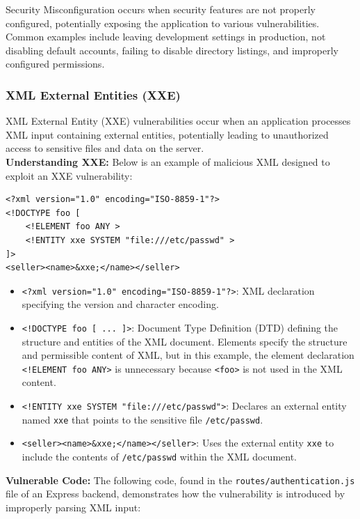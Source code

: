 \documentclass[]{article}
\begin{document}
Security Misconfiguration occurs when security features are not properly configured, potentially exposing the application to various vulnerabilities. Common examples include leaving development settings in production, not disabling default accounts, failing to disable directory listings, and improperly configured permissions.

\subsubsection{XML External Entities (XXE)}

XML External Entity (XXE) vulnerabilities occur when an application processes XML input containing external entities, potentially leading to unauthorized access to sensitive files and data on the server. \\ 
\textbf{Understanding XXE:}
Below is an example of malicious XML designed to exploit an XXE vulnerability:

\begin{lstlisting}
<?xml version="1.0" encoding="ISO-8859-1"?>
<!DOCTYPE foo [
    <!ELEMENT foo ANY >
    <!ENTITY xxe SYSTEM "file:///etc/passwd" >
]>
<seller><name>&xxe;</name></seller>
\end{lstlisting}

\begin{itemize}
    \item \texttt{<?xml version="1.0" encoding="ISO-8859-1"?>}: XML declaration specifying the version and character encoding.
    \item \texttt{<!DOCTYPE foo [ ... ]>}: Document Type Definition (DTD) defining the structure and entities of the XML document. Elements specify the structure and permissible content of XML, but in this example, the element declaration \texttt{<!ELEMENT foo ANY>} is unnecessary because \texttt{<foo>} is not used in the XML content.
    \item \texttt{<!ENTITY xxe SYSTEM "file:///etc/passwd">}: Declares an external entity named \texttt{xxe} that points to the sensitive file \texttt{/etc/passwd}.
    \item \texttt{<seller><name>\&xxe;</name></seller>}: Uses the external entity \texttt{xxe} to include the contents of \texttt{/etc/passwd} within the XML document.
\end{itemize}
\textbf{Vulnerable Code:}
The following code, found in the \texttt{routes/authentication.js} file of an Express backend, demonstrates how the vulnerability is introduced by improperly parsing XML input:
\end{document}
